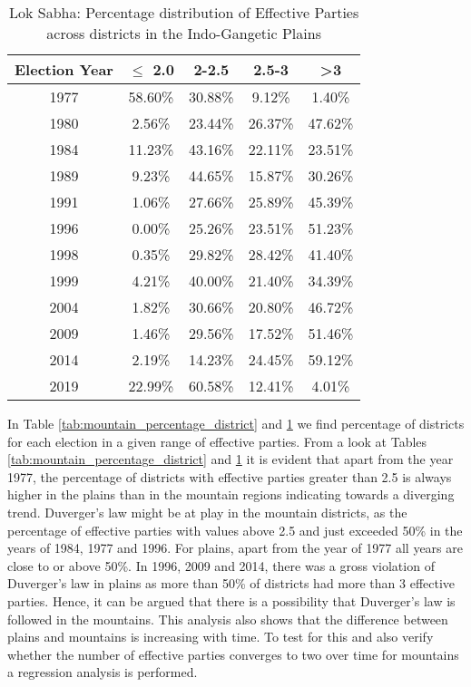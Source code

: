 \begin{table}[h]
\centering
\begin{tabular}{|c|c|c|c|c|}
\hline
Election Year & $\leq$ 2.0 & 2-2.5 & 2.5-3 & >3 \\ \hline
1977 & 58.60\% & 30.88\% & 9.12\% & 1.40\% \\ \hline
1980 & 2.56\% & 23.44\% & 26.37\% & 47.62\% \\ \hline
1984 & 11.23\% & 43.16\% & 22.11\% & 23.51\% \\ \hline
1989 & 9.23\% & 44.65\% & 15.87\% & 30.26\% \\ \hline
1991 & 1.06\% & 27.66\% & 25.89\% & 45.39\% \\ \hline
1996 & 0.00\% & 25.26\% & 23.51\% & 51.23\% \\ \hline
1998 & 0.35\% & 29.82\% & 28.42\% & 41.40\% \\ \hline
1999 & 4.21\% & 40.00\% & 21.40\% & 34.39\% \\ \hline
2004 & 1.82\% & 30.66\% & 20.80\% & 46.72\% \\ \hline
2009 & 1.46\% & 29.56\% & 17.52\% & 51.46\% \\ \hline
2014 & 2.19\% & 14.23\% & 24.45\% & 59.12\% \\ \hline
2019 & 22.99\% & 60.58\% & 12.41\% & 4.01\% \\ \hline
\end{tabular}
\caption{Lok Sabha: Percentage distribution of Effective Parties across districts in the Indo-Gangetic Plains}
\label{tab:plain_percentage_districts}

\end{table}
In Table \ref{tab:mountain_percentage_district} and \ref{tab:plain_percentage_districts} we find percentage of districts for each election in a given range of effective parties. From a look at Tables \ref{tab:mountain_percentage_district} and \ref{tab:plain_percentage_districts} it is evident that apart from the year 1977, the percentage of districts with effective parties greater than 2.5 is always higher in the plains than in the mountain regions indicating towards a diverging trend. Duverger’s law might be at play in the mountain districts, as the percentage of effective parties with values above 2.5 and just exceeded 50\% in the years of 1984, 1977 and 1996. For plains, apart from the year of 1977 all years are close to or above 50\%. In 1996, 2009 and 2014, there was a gross violation of Duverger’s law in plains as more than 50\% of districts had more than 3 effective parties. Hence, it can be argued that there is a possibility that  Duverger’s law is followed in the mountains. This analysis also shows that the difference between plains and mountains is increasing with time. To test for this and also verify whether the number of effective parties converges to two over time for mountains a regression analysis is performed.

